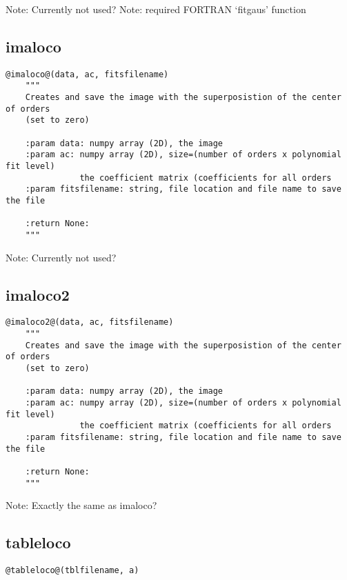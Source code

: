 \noindent Note: Currently not used?
\noindent Note: required FORTRAN `fitgaus' function

\vspace{0.5cm}
\subsection{imaloco}
\begin{lstlisting}[style=pythonstyle]
@imaloco@(data, ac, fitsfilename)
    """
    Creates and save the image with the superposistion of the center of orders
    (set to zero)

    :param data: numpy array (2D), the image
    :param ac: numpy array (2D), size=(number of orders x polynomial fit level)
               the coefficient matrix (coefficients for all orders
    :param fitsfilename: string, file location and file name to save the file
    
    :return None:
    """
\end{lstlisting}

\noindent Note: Currently not used?

\vspace{0.5cm}
\subsection{imaloco2}
\begin{lstlisting}[style=pythonstyle]
@imaloco2@(data, ac, fitsfilename)
    """
    Creates and save the image with the superposistion of the center of orders
    (set to zero)

    :param data: numpy array (2D), the image
    :param ac: numpy array (2D), size=(number of orders x polynomial fit level)
               the coefficient matrix (coefficients for all orders
    :param fitsfilename: string, file location and file name to save the file
    
    :return None:
    """
\end{lstlisting}

\noindent Note: Exactly the same as imaloco?

\vspace{0.5cm}
\subsection{tableloco}
\begin{lstlisting}[style=pythonstyle]
@tableloco@(tblfilename, a)
\end{lstlisting}

